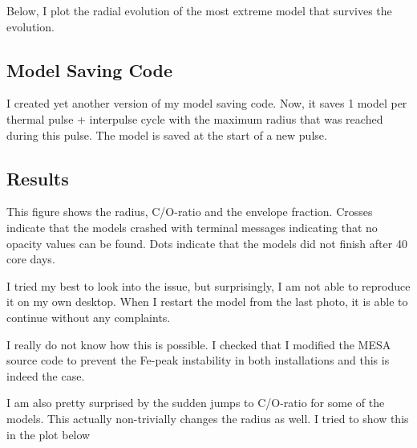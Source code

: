 \documentclass[a4paper,10pt]{article}
\begin{document}
\begin{figure}[ht]
    \centering
\end{figure}

Below, I plot the radial evolution of the most extreme model that survives the evolution.
\begin{figure}[ht]
    \centering
\end{figure}




\subsection{Model Saving Code}
I created yet another version of my model saving code. Now, it saves 1 model per thermal pulse + interpulse cycle with the maximum radius that was reached during this pulse. The model is saved at the start of a new pulse.

\subsection{Results}
This figure shows the radius, C/O-ratio and the envelope fraction. Crosses indicate that the models crashed with terminal messages indicating that no opacity values can be found. Dots indicate that the models did not finish after 40 core days.
\begin{figure}[ht]
    \centering
\end{figure}

I tried my best to look into the issue, but surprisingly, I am not able to reproduce it on my own desktop. When I restart the model from the last photo, it is able to continue without any complaints.

I really do not know how this is possible. I checked that I modified the MESA source code to prevent the Fe-peak instability in both installations and this is indeed the case.

I am also pretty surprised by the sudden jumps to C/O-ratio for some of the models. This actually non-trivially changes the radius as well. I tried to show this in the plot below
\end{document}

